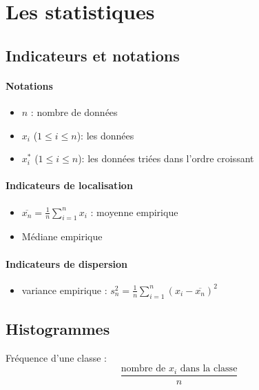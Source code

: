 \documentclass[11pt]{article}
\begin{document}
\section{Les statistiques}
\subsection{Indicateurs et notations}
\paragraph{Notations}
\begin{itemize}
    \item $n$ : nombre de données
    \item $x_i$ ($1 \leq i \leq n$): les données
    \item $x_i^*$ ($1 \leq i \leq n$): les données triées dans l'ordre croissant
\end{itemize}

\paragraph{Indicateurs de localisation}
\begin{itemize}
    \item $\overline{x_n} = \frac{1}{n}\sum_{i=1}^{n}x_i$ : moyenne empirique
    \item Médiane empirique
\end{itemize}

\paragraph{Indicateurs de dispersion}
\begin{itemize}
    \item variance empirique : $s_n^2 = \frac{1}{n}\sum_{i=1}^{n}(x_i-\overline{x_n})^2$
\end{itemize}

\subsection{Histogrammes}
Fréquence d'une classe : $$\frac{\text{nombre de }x_i\text{ dans la classe}}{n}$$
\end{document}
